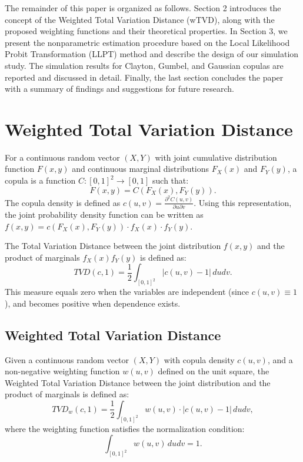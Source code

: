 \documentclass[twoside]{article}
\begin{document}
The remainder of this paper is organized as follows. Section 2 introduces the concept of the Weighted Total Variation Distance (wTVD), along with the proposed weighting functions and their theoretical properties. In Section 3, we present the nonparametric estimation procedure based on the Local Likelihood Probit Transformation (LLPT) method and describe the design of our simulation study. The simulation results for Clayton, Gumbel, and Gaussian copulas are reported and discussed in detail. Finally, the last section concludes the paper with a summary of findings and suggestions for future research.

\section{Weighted Total Variation Distance}

For a continuous random vector \( (X,Y) \) with joint cumulative distribution function \( F(x,y) \) and continuous marginal distributions \( F_X(x) \) and \( F_Y(y) \), a copula is a function \( C: [0,1]^2 \to [0,1] \) such that:
\[
F(x,y) = C(F_X(x), F_Y(y)).
\]
The copula density is defined as \( c(u,v) = \frac{\partial^2 C(u,v)}{\partial u \partial v} \). Using this representation, the joint probability density function can be written as \( f(x,y) = c(F_X(x), F_Y(y)) \cdot f_X(x) \cdot f_Y(y) \).

The Total Variation Distance between the joint distribution \( f(x,y) \) and the product of marginals \( f_X(x)f_Y(y) \) is defined as:
\begin{equation}\label{eq:TVD}
TVD(c,1) = \frac{1}{2} \int_{[0,1]^2} |c(u,v) - 1| \, du dv.
\end{equation}
This measure equals zero when the variables are independent (since \( c(u,v) \equiv 1 \)), and becomes positive when dependence exists.

\subsection{Weighted Total Variation Distance}

Given a continuous random vector \( (X,Y) \) with copula density \( c(u,v) \), and a non-negative weighting function \( w(u,v) \) defined on the unit square, the Weighted Total Variation Distance between the joint distribution and the product of marginals is defined as:
\begin{equation}\label{eq:wTVD}
TVD_w(c,1) = \frac{1}{2} \int_{[0,1]^2} w(u,v) \cdot |c(u,v) - 1| \, du dv,
\end{equation}
where the weighting function satisfies the normalization condition:
\begin{equation}\label{eq:norm}
\int_{[0,1]^2} w(u,v) \, du dv = 1.
\end{equation}
\end{document}

